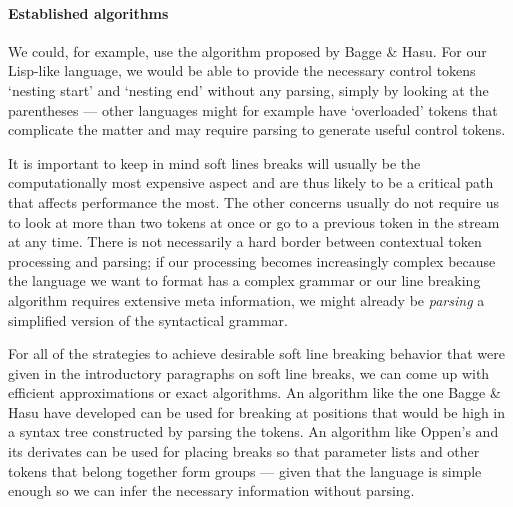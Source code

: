 \paragraph{Established algorithms}
We could, for example, use the algorithm proposed by Bagge \& Hasu.
\autocite[Chapter: Line Breaking]{prettyGoodFormattingPipeline}
For our Lisp-like language, we would be able to provide the necessary control tokens
`nesting start' and `nesting end' without any parsing, simply by looking at the parentheses
--- other languages might for example have `overloaded' tokens that complicate the matter
and may require parsing to generate useful control tokens.

It is important to keep in mind soft lines breaks will usually be the computationally
most expensive aspect and are thus likely to be a critical path that affects performance the most.
The other concerns usually do not require us to look at more than two tokens at once
or go to a previous token in the stream at any time.
There is not necessarily a hard border between contextual token processing and parsing;
if our processing becomes increasingly complex because the language we want to format
has a complex grammar or our line breaking algorithm requires extensive meta information,
we might already be \textit{parsing} a simplified version of the syntactical grammar.

For all of the strategies to achieve desirable soft line breaking behavior
that were given in the introductory paragraphs on soft line breaks,
we can come up with efficient approximations or exact algorithms.
An algorithm like the one Bagge \& Hasu have developed can be used for breaking at positions
that would be high in a syntax tree constructed by parsing the tokens.
An algorithm like Oppen's \autocite{prettyprinting} and its derivates
can be used for placing breaks so that parameter lists
and other tokens that belong together form groups ---
given that the language is simple enough
so we can infer the necessary information without parsing.
